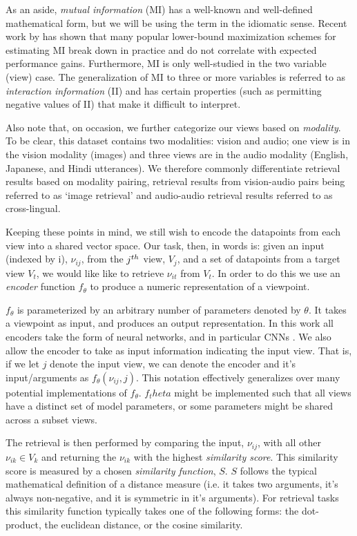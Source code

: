 As an aside, \textit{mutual information} (MI) has a well-known and well-defined mathematical form, but we will be using the term in the idiomatic sense.
Recent work by \citeme{} has shown that  many popular lower-bound maximization schemes for estimating MI break down in practice and do not correlate with expected performance gains.
Furthermore, MI is only well-studied in the two variable (view) case. 
The generalization of MI to three or more variables is referred to as \textit{interaction information} (II) and has certain properties (such as permitting negative values of II) that make it difficult to interpret.

Also note that, on occasion, we further categorize our views based on \textit{modality}.
To be clear, this dataset contains two modalities: vision and audio; one view is in the vision modality (images) and three views are in the audio modality (English, Japanese, and Hindi utterances).
We therefore commonly differentiate retrieval results based on modality pairing, retrieval results from vision-audio pairs being referred to as `image retrieval' and audio-audio retrieval results referred to as cross-lingual.

Keeping these points in mind, we still wish to encode the datapoints from each view into a shared vector space. 
Our task, then, in words is: given an input (indexed by i), $\nu_{ij}$, from the $j^{th}$ view, $V_j$, and a set of datapoints from a target view $V_t$, we would like like to retrieve $\nu_{it}$ from $V_t$.
In order to do this we use an \textit{encoder} function $f_\theta$ to produce a numeric representation of a viewpoint.

$f_\theta$ is parameterized by an arbitrary number of parameters denoted by $\theta$.
It takes a viewpoint as input, and produces an output representation.
In this work all encoders take the form of neural networks, and in particular CNNs .
We also allow the encoder to take as input information indicating the input view.
That is, if we let $j$ denote the input view, we can denote the encoder and it's input/arguments as $f_\theta(\nu_{ij},j)$.
This notation effectively generalizes over many potential implementations of $f_\theta$. 
$f_theta$ might be implemented such that all views have a distinct set of model parameters, or some parameters might be shared across a subset views.


The retrieval is then performed by comparing the input, $\nu_{ij}$, with all other $\nu_{ik} \in V_k$ and returning the $\nu_{ik}$ with the highest \textit{similarity score}.
This similarity score is measured by a chosen \textit{similarity function}, $S$.
$S$ follows the typical mathematical definition of a distance measure (i.e. it takes two arguments, it's always non-negative, and it is symmetric in it's arguments).
For retrieval tasks this similarity function typically takes one of the following forms: the dot-product, the euclidean distance, or the cosine similarity.

